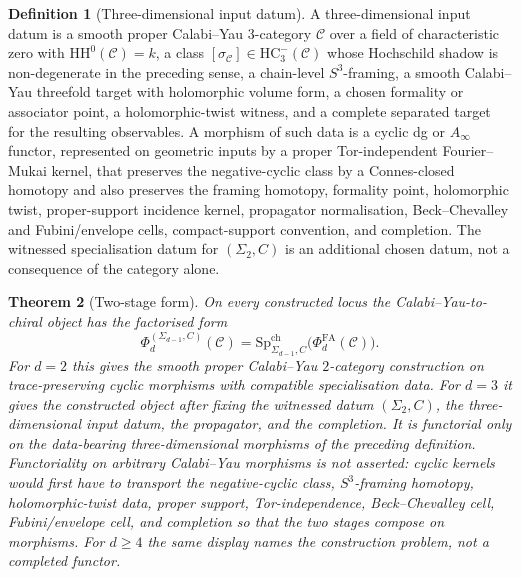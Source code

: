 \documentclass[11pt]{amsart}
\providecommand{\cC}{\mathcal{C}}
\providecommand{\PhiFA}{\Phi^{\mathrm{FA}}}
\providecommand{\SpCh}{\mathrm{Sp}^{\mathrm{ch}}}
\providecommand{\HH}{\mathrm{HH}}
\providecommand{\HC}{\mathrm{HC}}
\newtheorem{theorem}{Theorem}
\theoremstyle{definition}
\newtheorem{definition}[theorem]{Definition}
\theoremstyle{remark}
\begin{document}
\begin{definition}[Three-dimensional input datum]
A three-dimensional input datum is a smooth proper Calabi--Yau
\(3\)-category \(\cC\) over a field of characteristic zero with
\(\HH^0(\cC)=k\), a class \([\sigma_\cC]\in\HC^-_3(\cC)\) whose
Hochschild shadow is non-degenerate in the preceding sense, a chain-level
\(S^3\)-framing, a smooth Calabi--Yau threefold target with holomorphic
volume form, a chosen formality or associator point, a holomorphic-twist
witness, and a complete separated target for the resulting observables. A
morphism of such data is a cyclic dg or \(A_\infty\) functor, represented
on geometric inputs by a proper Tor-independent Fourier--Mukai kernel, that
preserves the negative-cyclic class by a Connes-closed homotopy and also
preserves the framing homotopy, formality point, holomorphic twist,
proper-support incidence kernel, propagator normalisation,
Beck--Chevalley and Fubini/envelope cells, compact-support convention, and
completion. The witnessed specialisation datum for \((\Sigma_2,C)\) is an
additional chosen datum, not a consequence of the category alone.
\end{definition}

\begin{theorem}[Two-stage form]
On every constructed locus the Calabi--Yau-to-chiral object
has the factorised form
\[
        \Phi_d^{(\Sigma_{d-1},C)}(\cC)
        =
        \SpCh_{\Sigma_{d-1},C}\bigl(\PhiFA_d(\cC)\bigr).
\]
For \(d=2\) this gives the smooth proper Calabi--Yau \(2\)-category
construction on trace-preserving cyclic morphisms with compatible
specialisation data.
For \(d=3\) it gives the constructed object after fixing the witnessed
datum \((\Sigma_2,C)\), the three-dimensional input datum, the propagator,
and the completion. It is functorial only on the data-bearing
three-dimensional morphisms of the preceding definition. Functoriality on
arbitrary Calabi--Yau morphisms is not asserted: cyclic kernels would first
have to transport the negative-cyclic class, \(S^3\)-framing homotopy,
holomorphic-twist data, proper support, Tor-independence,
Beck--Chevalley cell, Fubini/envelope cell, and completion so that the two
stages compose on morphisms. For \(d\geq4\) the same display names the
construction problem, not a completed functor.
\end{theorem}
\end{document}
